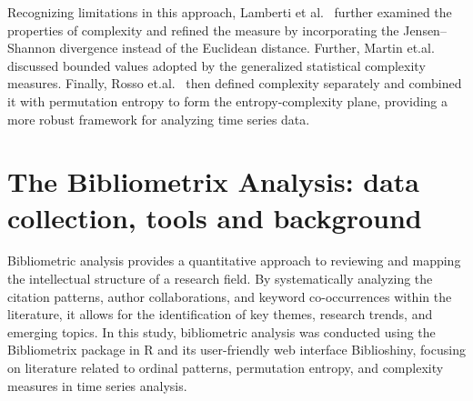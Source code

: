 Recognizing limitations in this approach, Lamberti et al.~\cite{lamberti2004intensive} further examined the properties of complexity and refined the measure by incorporating the Jensen–Shannon divergence instead of the Euclidean distance. Further, Martin et.al.~\cite{Martin2006} discussed bounded values adopted by the generalized statistical complexity measures. Finally, Rosso et.al.~\cite{Rosso2007} then defined complexity separately and combined it with permutation entropy to form the entropy-complexity plane, providing a more robust framework for analyzing time series data.

\section{The Bibliometrix Analysis: data collection, tools and background}
Bibliometric analysis provides a quantitative approach to reviewing and mapping the intellectual structure of a research field. By systematically analyzing the citation patterns, author collaborations, and keyword co-occurrences within the literature, it allows for the identification of key themes, research trends, and emerging topics. In this study, bibliometric analysis was conducted using the Bibliometrix package in R and its user-friendly web interface Biblioshiny, focusing on literature related to ordinal patterns, permutation entropy, and complexity measures in time series analysis.

